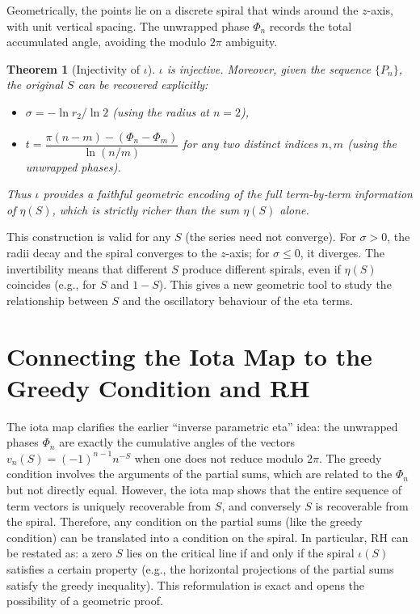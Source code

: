 \documentclass[12pt,a4paper]{article}
\newtheorem{theorem}{Theorem}[section]
\begin{document}
Geometrically, the points lie on a discrete spiral that winds around the $z$-axis, with unit vertical spacing. The unwrapped phase $\Phi_n$ records the total accumulated angle, avoiding the modulo $2\pi$ ambiguity.

\begin{theorem}[Injectivity of $\iota$]
$\iota$ is injective. Moreover, given the sequence $\{P_n\}$, the original $S$ can be recovered explicitly:
\begin{itemize}
    \item $\sigma = -\ln r_2 / \ln 2$ (using the radius at $n=2$),
    \item $t = \dfrac{\pi(n-m) - (\Phi_n-\Phi_m)}{\ln(n/m)}$ for any two distinct indices $n,m$ (using the unwrapped phases).
\end{itemize}
Thus $\iota$ provides a faithful geometric encoding of the full term‑by‑term information of $\eta(S)$, which is strictly richer than the sum $\eta(S)$ alone.
\end{theorem}

This construction is valid for any $S$ (the series need not converge). For $\sigma>0$, the radii decay and the spiral converges to the $z$-axis; for $\sigma\le0$, it diverges. The invertibility means that different $S$ produce different spirals, even if $\eta(S)$ coincides (e.g., for $S$ and $1-S$). This gives a new geometric tool to study the relationship between $S$ and the oscillatory behaviour of the eta terms.

\section{Connecting the Iota Map to the Greedy Condition and RH}

The iota map clarifies the earlier “inverse parametric eta” idea: the unwrapped phases $\Phi_n$ are exactly the cumulative angles of the vectors $v_n(S)=(-1)^{n-1}n^{-S}$ when one does not reduce modulo $2\pi$. The greedy condition involves the arguments of the partial sums, which are related to the $\Phi_n$ but not directly equal. However, the iota map shows that the entire sequence of term vectors is uniquely recoverable from $S$, and conversely $S$ is recoverable from the spiral. Therefore, any condition on the partial sums (like the greedy condition) can be translated into a condition on the spiral. In particular, RH can be restated as: a zero $S$ lies on the critical line if and only if the spiral $\iota(S)$ satisfies a certain property (e.g., the horizontal projections of the partial sums satisfy the greedy inequality). This reformulation is exact and opens the possibility of a geometric proof.
\end{document}
